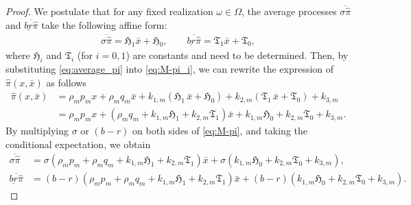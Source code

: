\documentclass[10pt,a4paper]{amsart}
\begin{document}
	\begin{proof}
We postulate that for any fixed realization \(\omega \in \Omega\), the average processes \(\overline{\sigma\widehat{\pi}}\) and \(\overline{\underline{br}\widehat{\pi}}\) take the following affine form:
	\begin{align}\label{eq:average_pi}
		\overline{\sigma\hat{\pi}}  = \mathfrak{H}_1\bar{x}  + \mathfrak{H}_0,
		\qquad
		\overline{\underline{br}\hat{\pi}} = \mathfrak{T}_1\bar{x}  + \mathfrak{T}_0,
	\end{align}
	where  $\mathfrak{H}_i$ and \(\mathfrak{T}_i\) (for \(i=0,1\)) are constants and need to be determined.
Then, by substituting \eqref{eq:average_pi} into \eqref{eq:M-pi_i}, we can rewrite the expression of \(\widehat{\pi}(x,\bar{x})\) as follows
\begin{align}
\widehat{\pi}(x, \bar{x})&= \rho_{\scriptscriptstyle m} p_{\scriptscriptstyle m} x + \rho_{\scriptscriptstyle m} q_{\scriptscriptstyle m} \bar{x} + k_{1,\scriptscriptstyle m} \left(\mathfrak{H}_1\,\bar{x} +\mathfrak{H}_0\right)+ k_{2,\scriptscriptstyle m}\left(\mathfrak{T}_1\,\bar{x} + \mathfrak{T}_0\right) +k_{3,\scriptscriptstyle m}\\
		&=\rho_{\scriptscriptstyle m}p_{\scriptscriptstyle m} x+\left(\rho_{\scriptscriptstyle m} q_{\scriptscriptstyle m} +k_{1,\scriptscriptstyle m}\mathfrak{H}_1+k_{2,\scriptscriptstyle m}\mathfrak{T}_1\right)\bar{x}+k_{1,\scriptscriptstyle m}\mathfrak{H}_0+k_{2,\scriptscriptstyle m}\mathfrak{T}_0+k_{3,\scriptscriptstyle m}. \label{eq:M-pi}
	\end{align}
By multiplying $\sigma$ or $(b-r)$ on both sides of \eqref{eq:M-pi}, and taking the conditional expectation, we obtain
\begin{align*}
\overline{\sigma\widehat{\pi}}&=\sigma\left(\rho_{\scriptscriptstyle m}p_{\scriptscriptstyle m}+\rho_{\scriptscriptstyle m} q_{\scriptscriptstyle m} +k_{1,\scriptscriptstyle m}\mathfrak{H}_1+k_{2,\scriptscriptstyle m}\mathfrak{T}_1\right)\bar{x}+\sigma \left(k_{1,\scriptscriptstyle m}\mathfrak{H}_0+k_{2,\scriptscriptstyle m}\mathfrak{T}_0+k_{3,\scriptscriptstyle m}\right),\\
\overline{\underline{br}\widehat{\pi}}&=(b-r)\left(\rho_{\scriptscriptstyle m}p_{\scriptscriptstyle m}+\rho_{\scriptscriptstyle m} q_{\scriptscriptstyle m} +k_{1,\scriptscriptstyle m}\mathfrak{H}_1+k_{2,\scriptscriptstyle m}\mathfrak{T}_1\right)\bar{x}+(b-r) \left(k_{1,\scriptscriptstyle m}\mathfrak{H}_0+k_{2,\scriptscriptstyle m}\mathfrak{T}_0+k_{3,\scriptscriptstyle m}\right).
\end{align*}

\end{proof}
\end{document}
